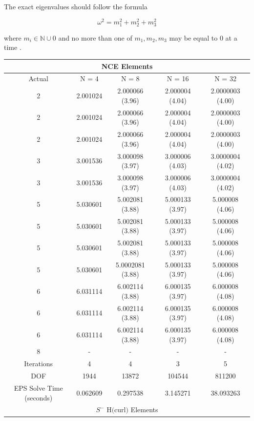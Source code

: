 \documentclass[manuscript,screen]{acmart}
\newcommand{\akg}[1]{\textcolor{blue}{\textbf{AG:} #1}}
\begin{document}
The exact eigenvalues should follow the formula

\[ \omega^2 = m_1^2 + m_2^2 + m_3^2 \]

\noindent where $m_i \in \mathbb{N} \cup {0}$ and no more than one of $m_1, m_2, m_3$ may be equal to $0$ at a time \cite{rognes2010efficient}.


\begin{center}
\begin{table}
\begin{tabular}{ c c c c c }
\multicolumn{5}{c}{NCE Elements} \\
\hline
Actual & N = 4 & N = 8 & N = 16 & N = 32 \\ 
\hline
2 &2.001024 & 2.000066 (3.96) & 2.000004 (4.04) & 2.0000003 (4.00) \\  
2 & 2.001024 & 2.000066 (3.96) & 2.000004 (4.04) & 2.0000003 (4.00)  \\
2 & 2.001024 & 2.000066 (3.96) & 2.000004 (4.04) & 2.0000003 (4.00)\\
3 & 3.001536 & 3.000098 (3.97) & 3.000006 (4.03) & 3.0000004 (4.02) \\
3 & 3.001536 & 3.000098 (3.97) & 3.000006 (4.03) & 3.0000004 (4.02) \\
5 & 5.030601 & 5.002081 (3.88)& 5.000133 (3.97) & 5.000008 (4.06) \\
5 & 5.030601 & 5.002081 (3.88)& 5.000133 (3.97) & 5.000008 (4.06) \\
5 & 5.030601 & 5.002081 (3.88) & 5.000133 (3.97) & 5.000008 (4.06) \\
5 & 5.030601 & 5.0002081 (3.88) & 5.000133 (3.97) & 5.000008 (4.06) \\
6 & 6.031114 & 6.002114 (3.88) & 6.000135 (3.97) &  6.000008 (4.08) \\
6 & 6.031114 & 6.002114 (3.88) & 6.000135 (3.97) & 6.000008 (4.08) \\
6 & 6.031114 & 6.002114 (3.88) & 6.000135 (3.97) & 6.000008 (4.08) \\
8 & - & -& - & - \\
\hline
Iterations & 4 & 4 & 3 & 5 \\
\hline
DOF  & 1944 & 13872 & 104544 & 811200 \\
\hline
EPS Solve Time (seconds) & 0.062609 & 0.297538 & 3.145271 & 38.093263 \\
\hline
\multicolumn{5}{c}{$S^-$ H$($curl$)$ Elements} \\
\hline

\end{tabular}
\end{table}
\end{center}
\end{document}
